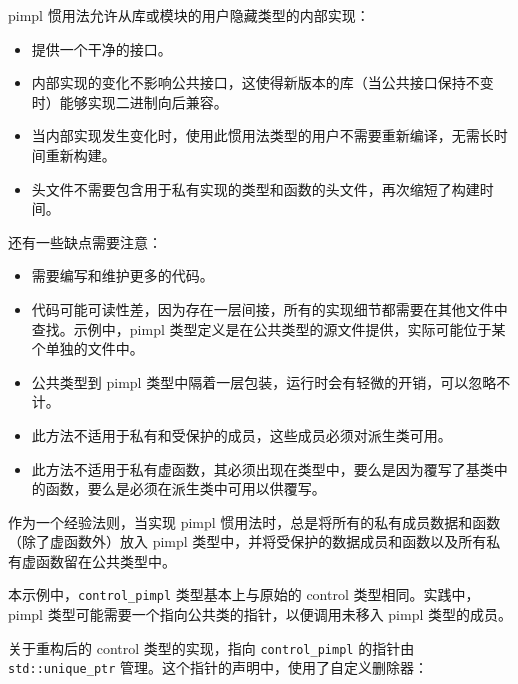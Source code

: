 
pimpl 惯用法允许从库或模块的用户隐藏类型的内部实现：

\begin{itemize}
\item
提供一个干净的接口。

\item
内部实现的变化不影响公共接口，这使得新版本的库（当公共接口保持不变时）能够实现二进制向后兼容。

\item
当内部实现发生变化时，使用此惯用法类型的用户不需要重新编译，无需长时间重新构建。

\item
头文件不需要包含用于私有实现的类型和函数的头文件，再次缩短了构建时间。
\end{itemize}

还有一些缺点需要注意：

\begin{itemize}
\item
需要编写和维护更多的代码。

\item
代码可能可读性差，因为存在一层间接，所有的实现细节都需要在其他文件中查找。示例中，pimpl 类型定义是在公共类型的源文件提供，实际可能位于某个单独的文件中。

\item
公共类型到 pimpl 类型中隔着一层包装，运行时会有轻微的开销，可以忽略不计。

\item
此方法不适用于私有和受保护的成员，这些成员必须对派生类可用。

\item
此方法不适用于私有虚函数，其必须出现在类型中，要么是因为覆写了基类中的函数，要么是必须在派生类中可用以供覆写。
\end{itemize}

\begin{myTip}
作为一个经验法则，当实现 pimpl 惯用法时，总是将所有的私有成员数据和函数（除了虚函数外）放入 pimpl 类型中，并将受保护的数据成员和函数以及所有私有虚函数留在公共类型中。
\end{myTip}

本示例中，\verb|control_pimpl| 类型基本上与原始的 control 类型相同。实践中，pimpl 类型可能需要一个指向公共类的指针，以便调用未移入 pimpl 类型的成员。

关于重构后的 control 类型的实现，指向 \verb|control_pimpl| 的指针由 \verb|std::unique_ptr| 管理。这个指针的声明中，使用了自定义删除器：

